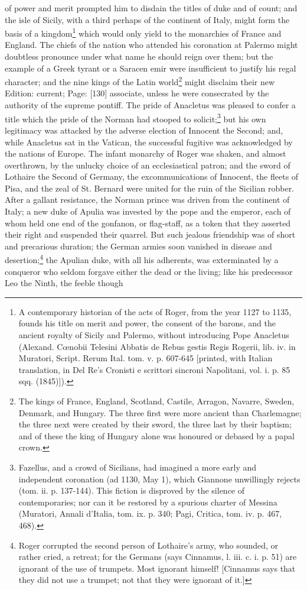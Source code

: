 of power and merit prompted him to disdain the titles of duke and of count; and the isle of Sicily, with a third perhaps of the continent of Italy, might form the basis of a kingdom\footnote{A contemporary historian of the acts of Roger, from the year 1127 to 1135, founds his title on merit and power, the consent of the barons, and the ancient royalty of Sicily and Palermo, without introducing Pope Anacletus (Alexand. Cœnobii Telesini Abbatis de Rebus gestis Regis Rogerii, lib. iv. in Muratori, Script. Rerum Ital. tom. v. p. 607-645 [printed, with Italian translation, in Del Re\texthebrew{}’s Cronisti e scrittori sincroni Napolitani, vol. i. p. 85 sqq. (1845)]).} which would only yield to the monarchies of France and England. The chiefs of the nation who attended his coronation at Palermo might doubtless pronounce under what name he should reign over them; but the example of a Greek tyrant or a Saracen emir were insufficient to justify his regal character; and the nine kings of the Latin world\footnote{The kings of France, England, Scotland, Castile, Arragon, Navarre, Sweden, Denmark, and Hungary. The three first were more ancient than Charlemagne; the three next were created by their sword, the three last by their baptism; and of these the king of Hungary alone was honoured or debased by a papal crown.} might disclaim their new Edition: current; Page: [130] associate, unless he were consecrated by the authority of the supreme pontiff. The pride of Anacletus was pleased to confer a title which the pride of the Norman had stooped to solicit;\footnote{Fazellus, and a crowd of Sicilians, had imagined a more early and independent coronation (ad 1130, May 1), which Giannone unwillingly rejects (tom. ii. p. 137-144). This fiction is disproved by the silence of contemporaries; nor can it be restored by a spurious charter of Messina (Muratori, Annali d\texthebrew{}’Italia, tom. ix. p. 340; Pagi, Critica, tom. iv. p. 467, 468).} but his own legitimacy was attacked by the adverse election of Innocent the Second; and, while Anacletus sat in the Vatican, the successful fugitive was acknowledged by the nations of Europe. The infant monarchy of Roger was shaken, and almost overthrown, by the unlucky choice of an ecclesiastical patron; and the sword of Lothaire the Second of Germany, the excommunications of Innocent, the fleets of Pisa, and the zeal of St. Bernard were united for the ruin of the Sicilian robber. After a gallant resistance, the Norman prince was driven from the continent of Italy; a new duke of Apulia was invested by the pope and the emperor, each of whom held one end of the gonfanon, or flag-staff, as a token that they asserted their right and suspended their quarrel. But such jealous friendship was of short and precarious duration; the German armies soon vanished in disease and desertion;\footnote{Roger corrupted the second person of Lothaire\texthebrew{}’s army, who sounded, or rather cried, a retreat; for the Germans (says Cinnamus, l. iii. c. i. p. 51) are ignorant of the use of trumpets. Most ignorant himself! [Cinnamus says that they did not use a trumpet; not that they were ignorant of it.]} the Apulian duke, with all his adherents, was exterminated by a conqueror who seldom forgave either the dead or the living; like his predecessor Leo the Ninth, the feeble though 